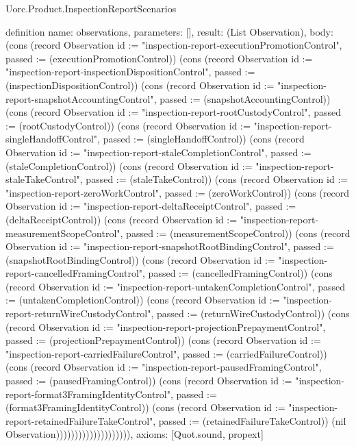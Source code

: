 \begin{lexlean}{Uorc.Product.InspectionReportScenarios}
\begin{semanticmodule}
definition{
  name: observations,
  parameters: [],
  result: (List Observation),
  body: (cons (record Observation {id := "inspection-report-executionPromotionControl", passed := (executionPromotionControl)}) (cons (record Observation {id := "inspection-report-inspectionDispositionControl", passed := (inspectionDispositionControl)}) (cons (record Observation {id := "inspection-report-snapshotAccountingControl", passed := (snapshotAccountingControl)}) (cons (record Observation {id := "inspection-report-rootCustodyControl", passed := (rootCustodyControl)}) (cons (record Observation {id := "inspection-report-singleHandoffControl", passed := (singleHandoffControl)}) (cons (record Observation {id := "inspection-report-staleCompletionControl", passed := (staleCompletionControl)}) (cons (record Observation {id := "inspection-report-staleTakeControl", passed := (staleTakeControl)}) (cons (record Observation {id := "inspection-report-zeroWorkControl", passed := (zeroWorkControl)}) (cons (record Observation {id := "inspection-report-deltaReceiptControl", passed := (deltaReceiptControl)}) (cons (record Observation {id := "inspection-report-measurementScopeControl", passed := (measurementScopeControl)}) (cons (record Observation {id := "inspection-report-snapshotRootBindingControl", passed := (snapshotRootBindingControl)}) (cons (record Observation {id := "inspection-report-cancelledFramingControl", passed := (cancelledFramingControl)}) (cons (record Observation {id := "inspection-report-untakenCompletionControl", passed := (untakenCompletionControl)}) (cons (record Observation {id := "inspection-report-returnWireCustodyControl", passed := (returnWireCustodyControl)}) (cons (record Observation {id := "inspection-report-projectionPrepaymentControl", passed := (projectionPrepaymentControl)}) (cons (record Observation {id := "inspection-report-carriedFailureControl", passed := (carriedFailureControl)}) (cons (record Observation {id := "inspection-report-pausedFramingControl", passed := (pausedFramingControl)}) (cons (record Observation {id := "inspection-report-format3FramingIdentityControl", passed := (format3FramingIdentityControl)}) (cons (record Observation {id := "inspection-report-retainedFailureTakeControl", passed := (retainedFailureTakeControl)}) (nil Observation)))))))))))))))))))),
  axioms: [Quot.sound, propext]
}
\end{semanticmodule}
\end{lexlean}
